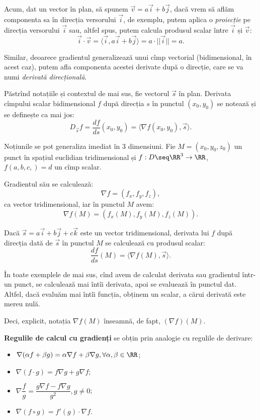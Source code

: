 Acum, dat un vector în plan, să spunem $ \vec{v} = a \vec{i} + b \vec{j} $, dacă
vrem să aflăm componenta sa în direcția versorului $ \vec{i} $, de exemplu,
putem aplica o \emph{proiecție} pe direcția versorului $ \vec{i} $ sau, altfel
spus, putem calcula produsul scalar între $ \vec{i} $ și $ \vec{v} $:
\[
  \vec{i} \cdot \vec{v} = \langle \vec{i}, a \vec{i} + b \vec{j} \rangle %
  = a \cdot ||\vec{i}|| = a.
\]

Similar, deoarece gradientul generalizează  unui cîmp vectorial
(bidimensional, în acest caz), putem afla componenta acestei derivate după
o direcție, care se va numi \emph{derivată direcțională}.

\begin{definition}\label{def:der-dir}
  Păstrînd notațiile și contextul de mai sus, fie vectorul $ \vec{s} $ în
  plan. Derivata cîmpului scalar bidimensional $ f $ după direcția $ s $
  în punctul $ (x_0, y_0) $ se notează și se definește ca mai jos:
  \[
    D_{\vec{s}} f = \dfrac{df}{ds} (x_0, y_0) = \langle \nabla f(x_0, y_0), \vec{s} \rangle.
  \]
\end{definition}

Noțiunile se pot generaliza imediat în 3 dimensiuni. Fie $ M = (x_0, y_0, z_0) $ un
punct în spațiul euclidian tridimensional și $ f : D \seq \RR^3 \to \RR $,
$ f(a, b, c,) = d $ un cîmp scalar.

Gradientul său se calculează:
\[
  \nabla f = (f_x, f_y, f_z),
\]
ca vector tridimensional, iar în punctul $ M $ avem:
\[
  \nabla f (M) = (f_x(M), f_y(M), f_z(M)).
\]

Dacă $ \vec{s} = a \vec{i} + b \vec{j} + c \vec{k} $ este un vector tridimensional,
derivata lui $ f $ după direcția dată de $ \vec{s} $ în punctul $ M $
se calculează cu produsul scalar:
\[
  \dfrac{df}{ds}(M) = \langle \nabla f(M), \vec{s} \rangle.
\]

\begin{remark}\label{rk:grad}
  În toate exemplele de mai sus, cînd avem de calculat derivata sau gradientul într-un
  punct, se calculează mai întîi derivata, apoi se evaluează în punctul dat. Altfel,
  dacă evaluăm mai întîi funcția, obținem un scalar, a cărui derivată este mereu nulă.

  Deci, explicit, notația $ \nabla f (M) $ înseamnă, de fapt, $ (\nabla f)(M) $.
\end{remark}

\textbf{Regulile de calcul cu gradienți} se obțin prin analogie cu regulile de derivare:
\begin{itemize}
\item $ \nabla (\alpha f + \beta g) = \alpha \nabla f + \beta \nabla g, \forall \alpha, \beta \in \RR $;
\item $ \nabla (f \cdot g) = f \nabla g + g \nabla f $;
\item $ \nabla \dfrac{f}{g} = \dfrac{g \nabla f - f \nabla g}{g^2}, g \neq 0 $;
\item $ \nabla (f \circ g) = f'(g) \cdot \nabla f $.
\end{itemize}

